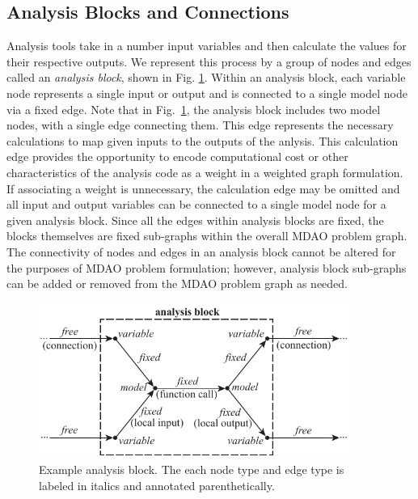 \subsection{Analysis Blocks and Connections}
\label{ss:analysis blocks and connections}
Analysis tools take in a number input variables and then calculate 
the values for their respective outputs. We represent this process
by a group of nodes and edges called an \emph{analysis block}, 
shown in Fig. \ref{f:analysis block}. Within an analysis block, each variable 
node represents a single input or output and is connected 
to a single model node via a fixed edge. Note that in Fig.~\ref{f:analysis block}, 
the analysis block includes two model nodes, with a single edge connecting them. 
This edge represents the necessary calculations to map given inputs 
to the outputs of the anlysis. This calculation edge provides the opportunity 
to encode computational cost or other characteristics of the analysis code as 
a weight in a weighted graph formulation. If associating a weight is 
unnecessary, the calculation edge may be omitted and all input and output 
variables can be connected to a single model node for a given analysis block. 
Since all the edges within analysis blocks are fixed, the blocks themselves are 
fixed sub-graphs within the overall MDAO problem graph. The connectivity of 
nodes and edges in an analysis block cannot be altered for the purposes of MDAO 
problem formulation; however, analysis block sub-graphs can be added or removed 
from the MDAO problem graph as needed.

\begin{figure}[htb!]
    \begin{center}
    \includegraphics[width=4in]{images/analysis_block}
    \end{center}
    \vspace{-10pt}
\caption{Example analysis block. The each node type and edge type is labeled in italics and annotated parenthetically.}
\label{f:analysis block}
\end{figure}

